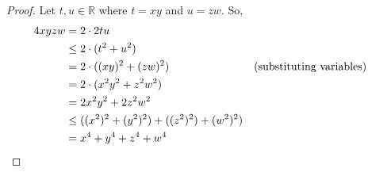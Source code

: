 \documentclass{article}
\begin{document}
\begin{proof}
  Let $t,u \in \mathbb{R}$ where $t=xy$ and $u=zw$. So,
  \begin{align*}
    4xyzw &= 2\cdot2tu \\
    &\le 2\cdot(t^2+u^2) \\
    &= 2\cdot((xy)^2+(zw)^2) &&\text{(substituting variables)} \\
    &= 2\cdot(x^2y^2+z^2w^2) \\ 
    &= 2x^2y^2+2z^2w^2 \\
    &\le ((x^2)^2+(y^2)^2)+((z^2)^2)+(w^2)^2) \\
    &= x^4+y^4+z^4+w^4 &&\qedhere
  \end{align*}
\end{proof}
\end{document}
